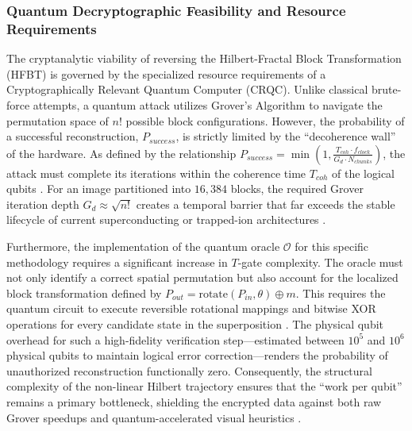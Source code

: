 \documentclass[12pt,fleqn]{article}
\begin{document}
\subsubsection{Quantum Decryptographic Feasibility and Resource Requirements}

The cryptanalytic viability of reversing the Hilbert-Fractal Block Transformation (HFBT) is governed by the specialized resource requirements of a Cryptographically Relevant Quantum Computer (CRQC). Unlike classical brute-force attempts, a quantum attack utilizes Grover's Algorithm to navigate the permutation space of $n!$ possible block configurations. However, the probability of a successful reconstruction, $P_{success}$, is strictly limited by the ``decoherence wall'' of the hardware. As defined by the relationship $P_{success} = \min(1, \frac{T_{coh} \cdot f_{clock}}{G_d \cdot N_{chunks}})$, the attack must complete its iterations within the coherence time $T_{coh}$ of the logical qubits \cite{bennett1997strengths}. For an image partitioned into $16,384$ blocks, the required Grover iteration depth $G_d \approx \sqrt{n!}$ creates a temporal barrier that far exceeds the stable lifecycle of current superconducting or trapped-ion architectures \cite{nielsen2010quantum}.

Furthermore, the implementation of the quantum oracle $\mathcal{O}$ for this specific methodology requires a significant increase in $T$-gate complexity. The oracle must not only identify a correct spatial permutation but also account for the localized block transformation defined by $P_{out} = \text{rotate}(P_{in}, \theta) \oplus m$. This requires the quantum circuit to execute reversible rotational mappings and bitwise XOR operations for every candidate state in the superposition \cite{montanaro2016quantum}. The physical qubit overhead for such a high-fidelity verification step---estimated between $10^5$ and $10^6$ physical qubits to maintain logical error correction---renders the probability of unauthorized reconstruction functionally zero. Consequently, the structural complexity of the non-linear Hilbert trajectory ensures that the ``work per qubit'' remains a primary bottleneck, shielding the encrypted data against both raw Grover speedups and quantum-accelerated visual heuristics \cite{brassard2002quantum}.
\end{document}
